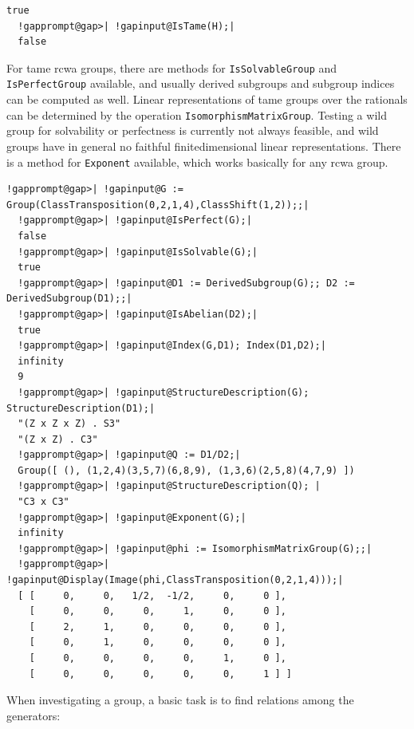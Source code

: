 \documentclass[a4paper,11pt]{report}
\begin{document}
{{\begin{Verbatim}[commandchars=!@|,fontsize=\small,frame=single,label=Example]
  true
  !gapprompt@gap>| !gapinput@IsTame(H);|
  false
\end{Verbatim}
       For tame rcwa groups, there are methods for \texttt{IsSolvableGroup} and \texttt{IsPerfectGroup} available, and usually derived subgroups and subgroup indices can be computed
as well. Linear representations of tame groups over the rationals can be
determined by the operation \texttt{IsomorphismMatrixGroup}. Testing a wild group for solvability or perfectness is currently not always
feasible, and wild groups have in general no faithful
finite\texttt{}dimensional linear representations. There is a
method for \texttt{Exponent} available, which works basically for any rcwa group. 
\begin{Verbatim}[commandchars=!@|,fontsize=\small,frame=single,label=Example]
  !gapprompt@gap>| !gapinput@G := Group(ClassTransposition(0,2,1,4),ClassShift(1,2));;|
  !gapprompt@gap>| !gapinput@IsPerfect(G);|
  false
  !gapprompt@gap>| !gapinput@IsSolvable(G);|
  true
  !gapprompt@gap>| !gapinput@D1 := DerivedSubgroup(G);; D2 := DerivedSubgroup(D1);;|
  !gapprompt@gap>| !gapinput@IsAbelian(D2);|
  true
  !gapprompt@gap>| !gapinput@Index(G,D1); Index(D1,D2);|
  infinity
  9
  !gapprompt@gap>| !gapinput@StructureDescription(G); StructureDescription(D1);|
  "(Z x Z x Z) . S3"
  "(Z x Z) . C3"
  !gapprompt@gap>| !gapinput@Q := D1/D2;|
  Group([ (), (1,2,4)(3,5,7)(6,8,9), (1,3,6)(2,5,8)(4,7,9) ])
  !gapprompt@gap>| !gapinput@StructureDescription(Q); |
  "C3 x C3"
  !gapprompt@gap>| !gapinput@Exponent(G);|
  infinity
  !gapprompt@gap>| !gapinput@phi := IsomorphismMatrixGroup(G);;|
  !gapprompt@gap>| !gapinput@Display(Image(phi,ClassTransposition(0,2,1,4)));|
  [ [     0,     0,   1/2,  -1/2,     0,     0 ], 
    [     0,     0,     0,     1,     0,     0 ], 
    [     2,     1,     0,     0,     0,     0 ], 
    [     0,     1,     0,     0,     0,     0 ], 
    [     0,     0,     0,     0,     1,     0 ], 
    [     0,     0,     0,     0,     0,     1 ] ]
\end{Verbatim}
 When investigating a group, a basic task is to find relations among the
generators: 

}}
\end{document}
